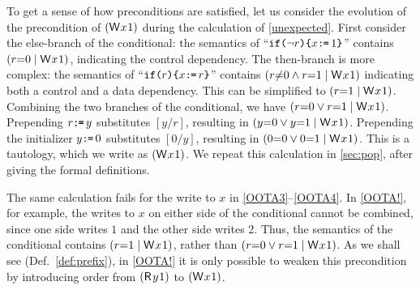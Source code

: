 To get a sense of how preconditions are satisfied, let us consider the
evolution of the precondition of $(\DW{x}{1})$ during the calculation of
\eqref{unexpected}.
First consider the else-branch of the conditional: the semantics of
``${\texttt{if}\allowbreak\texttt{(}\lnot r\texttt{)}\allowbreak\texttt{\{} x\texttt{:}\mkern-1mu\texttt{=}\,1 \texttt{\}}}$'' contains $(r{=}0 \mid \DW{x}{1})$,
indicating the control dependency.  The then-branch is more complex: the
semantics of ``${\texttt{if}\allowbreak\texttt{(}r\texttt{)}\allowbreak\texttt{\{} x\texttt{:}\mkern-1mu\texttt{=}\, r \texttt{\}}}$'' contains
$(r{\neq}0 \land r{=}1 \mid \DW{x}{1})$ indicating both a control and a data
dependency.  This can be simplified to $(r{=}1 \mid \DW{x}{1})$.  Combining
the two branches of the conditional, we have
$(r{=}0 \lor r{=}1 \mid \DW{x}{1})$.  Prepending $r\texttt{:}\mkern-1mu\texttt{=}\, y$ substitutes
$[y/r]$, resulting in $(y{=}0 \lor y{=}1 \mid \DW{x}{1})$.  Prepending the
initializer $y\texttt{:}\mkern-1mu\texttt{=}\, 0$ substitutes $[0/y]$, resulting in
$(0{=}0 \lor 0{=}1 \mid \DW{x}{1})$.  This is a tautology, which we write as
$(\DW{x}{1})$.   We repeat this calculation in \textsection\ref{sec:pop},
after giving the formal definitions.

The same calculation fails for the write to $x$ in \ref{OOTA3}--\ref{OOTA4}.
In \ref{OOTA!}, for example, the writes to $x$ on either side of the
conditional cannot be combined, since one side writes $1$ and the other side
writes $2$.  Thus, the semantics of the conditional contains
$(r{=}1 \mid \DW{x}{1})$, rather than $(r{=}0 \lor r{=}1 \mid \DW{x}{1})$.
As we shall see (Def.~\ref{def:prefix}), in \ref{OOTA!} it is only possible to weaken this
precondition by introducing order from $(\DR{y}{1})$ to $(\DW{x}{1})$.

